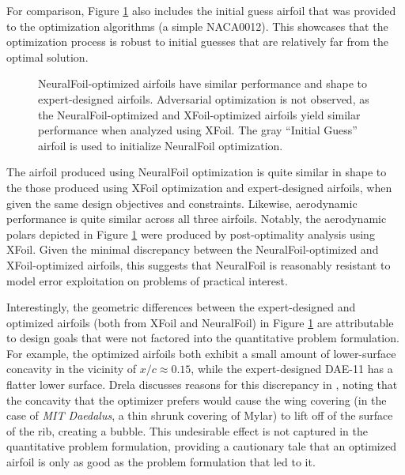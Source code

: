 For comparison, Figure \ref{fig:daedalus_optimized} also includes the initial guess airfoil that was provided to the optimization algorithms (a simple NACA0012). This showcases that the optimization process is robust to initial guesses that are relatively far from the optimal solution.

\begin{figure}[H]
    \centering
    
    \caption{NeuralFoil-optimized airfoils have similar performance and shape to expert-designed airfoils. Adversarial optimization is not observed, as the NeuralFoil-optimized and XFoil-optimized airfoils yield similar performance when analyzed using XFoil. The gray ``Initial Guess'' airfoil is used to initialize NeuralFoil optimization.}
    \label{fig:daedalus_optimized}
\end{figure}

The airfoil produced using NeuralFoil optimization is quite similar in shape to the those produced using XFoil optimization and expert-designed airfoils, when given the same design objectives and constraints. Likewise, aerodynamic performance is quite similar across all three airfoils. Notably, the aerodynamic polars depicted in Figure \ref{fig:daedalus_optimized} were produced by post-optimality analysis using XFoil. Given the minimal discrepancy between the NeuralFoil-optimized and XFoil-optimized airfoils, this suggests that NeuralFoil is reasonably resistant to model error exploitation on problems of practical interest.

Interestingly, the geometric differences between the expert-designed and optimized airfoils (both from XFoil and NeuralFoil) in Figure \ref{fig:daedalus_optimized} are attributable to design goals that were not factored into the quantitative problem formulation. For example, the optimized airfoils both exhibit a small amount of lower-surface concavity in the vicinity of $x/c \approx 0.15$, while the expert-designed DAE-11 has a flatter lower surface. Drela discusses reasons for this discrepancy in \cite{drela_pros_1998}, noting that the concavity that the optimizer prefers would cause the wing covering (in the case of \emph{MIT Daedalus}, a thin shrunk covering of Mylar) to lift off of the surface of the rib, creating a bubble. This undesirable effect is not captured in the quantitative problem formulation, providing a cautionary tale that an optimized airfoil is only as good as the problem formulation that led to it.


